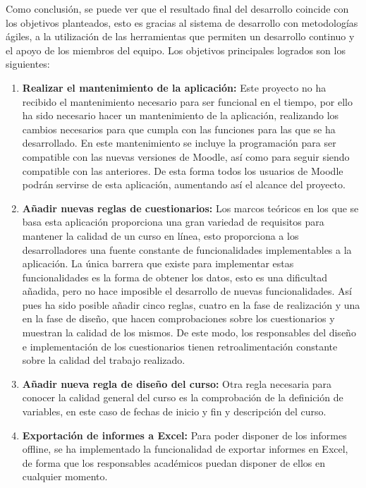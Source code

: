 Como conclusión, se puede ver que el resultado final del desarrollo coincide con los objetivos planteados, esto es gracias al sistema de desarrollo con metodologías ágiles, a la utilización de las herramientas que permiten un desarrollo continuo y el apoyo de los miembros del equipo. Los objetivos principales logrados son los siguientes:
\begin{enumerate}
    \item \textbf{Realizar el mantenimiento de la aplicación:} Este proyecto no ha recibido el mantenimiento necesario para ser funcional en el tiempo, por ello ha sido necesario hacer un mantenimiento de la aplicación, realizando los cambios necesarios para que cumpla con las funciones para las que se ha desarrollado. En este mantenimiento se incluye la programación para ser compatible con las nuevas versiones de Moodle, así como para seguir siendo compatible con las anteriores. De esta forma todos los usuarios de Moodle podrán servirse de esta aplicación, aumentando así el alcance del proyecto.
    \item \textbf{Añadir nuevas reglas de cuestionarios:} Los marcos teóricos en los que se basa esta aplicación proporciona una gran variedad de requisitos para mantener la calidad de un curso en línea, esto proporciona a los desarrolladores una fuente constante de funcionalidades implementables a la aplicación. La única barrera que existe para implementar estas funcionalidades es la forma de obtener los datos, esto es una dificultad añadida, pero no hace imposible el desarrollo de nuevas funcionalidades. Así pues ha sido posible añadir cinco reglas, cuatro en la fase de realización y una en la fase de diseño, que hacen comprobaciones sobre los cuestionarios y muestran la calidad de los mismos. De este modo, los responsables del diseño e implementación de los cuestionarios tienen retroalimentación constante sobre la calidad del trabajo realizado.
    \item \textbf{Añadir nueva regla de diseño del curso:} Otra regla necesaria para conocer la calidad general del curso es la comprobación de la definición de variables, en este caso de fechas de inicio y fin y descripción del curso.
    \item \textbf{Exportación de informes a Excel:} Para poder disponer de los informes offline, se ha implementado la funcionalidad de exportar informes en Excel, de forma que los responsables académicos puedan disponer de ellos en cualquier momento.
\end{enumerate}

